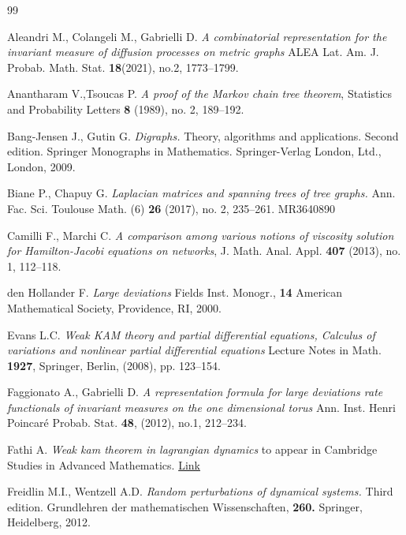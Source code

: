 \documentclass[reqno]{amsart}
\theoremstyle{plain}
\theoremstyle{definition}
\theoremstyle{remark}
\numberwithin{equation}{section}
\numberwithin{theorem}{section}
\newcommand{\<}{\langle}
\renewcommand{\>}{\rangle}
\begin{document}
%
%


\begin{thebibliography}{99}

 Aleandri M., Colangeli M., Gabrielli D.
\emph{A combinatorial representation for the invariant measure of diffusion processes on metric graphs}
ALEA Lat. Am. J. Probab. Math. Stat. \textbf{ 18}(2021), no.2, 1773–1799. 

 Anantharam V.,Tsoucas P. \emph{A proof of the Markov chain tree theorem},
Statistics and Probability Letters \textbf{ 8} (1989), no. 2, 189–192. 

 Bang-Jensen J., Gutin G. \emph{Digraphs.} Theory, algorithms and applications. Second edition. Springer Monographs in Mathematics. Springer-Verlag London, Ltd., London, 2009. 

 Biane P., Chapuy G.
\emph{Laplacian matrices and spanning trees of tree graphs.}
Ann. Fac. Sci. Toulouse Math. (6)   \textbf{ 26} (2017), no. 2, 235–261.  MR{3640890}

 Camilli F., Marchi C.
\emph{A comparison among various notions of viscosity solution for Hamilton-Jacobi equations on networks},
J. Math. Anal. Appl. \textbf{407} (2013), no. 1, 112–118. 

 den Hollander F. \emph{Large deviations}
Fields Inst. Monogr., \textbf{14}
American Mathematical Society, Providence, RI, 2000. 

 Evans L.C. \emph{Weak KAM theory and partial differential equations, Calculus of variations and nonlinear partial differential equations} Lecture Notes in Math. \textbf{1927}, Springer, Berlin, (2008), pp. 123–154. 

 Faggionato A., Gabrielli D. 
\emph{A representation formula for large deviations rate functionals of invariant measures on the one dimensional torus} Ann. Inst. Henri Poincaré Probab. Stat. \textbf{48}, (2012), no.1, 212–234. 

  Fathi A. \emph{Weak kam theorem in lagrangian dynamics} to appear in Cambridge Studies in Advanced Mathematics. \href{http://assets.cambridge.org/97805218/22282/description/9780521822282_description.htm}{Link}

 Freidlin M.I., Wentzell A.D. \emph{Random perturbations of dynamical systems.} Third edition. Grundlehren der mathematischen Wissenschaften, \textbf{260.} Springer, Heidelberg, 2012. 


\end{thebibliography}
\end{document}
